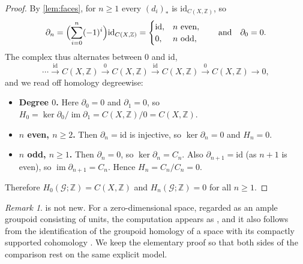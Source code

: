 \documentclass{extracta-temp-26}
\numberwithin{equation}{section}
\theoremstyle{definition}
\theoremstyle{remark}
\newtheorem{rem}[teo]{Remark}
\newcommand{\G}{\mathcal{G}}
\newcommand{\Z}{\mathbb{Z}}
\newcommand{\id}{\mathrm{id}}
\DeclareMathOperator{\im}{im}
\newcommand{\step}[1]{\textbf{#1}}
\begin{document}
\begin{proof}
By \cref{lem:faces}, for \(n\ge 1\) every \((d_i)_*\) is \(\id_{C(X,\Z)}\), so
\begin{equation}\label{eq:moore-differential}
\partial_n=\Bigl(\sum_{i=0}^n(-1)^i\Bigr)\id_{C(X,\Z)}
=
\begin{cases}
\id,& n\ \text{even},\\
0,& n\ \text{odd},
\end{cases}
\qquad\text{and}\quad\partial_0=0.
\end{equation}
The complex thus alternates between \(0\) and \(\id\),
\begin{equation}\label{eq:unit-complex}
\cdots\xrightarrow{\id}C(X,\Z)\xrightarrow{0}C(X,\Z)
\xrightarrow{\id}C(X,\Z)\xrightarrow{0}C(X,\Z)\to 0,
\end{equation}
and we read off homology degreewise:
\begin{itemize}
\item \step{Degree \(0\).} Here \(\partial_0=0\) and \(\partial_1=0\), so \(H_0=\ker\partial_0/\im\partial_1=C(X,\Z)/0=C(X,\Z)\).
\item \step{\(n\) even, \(n\ge 2\).} Then \(\partial_n=\id\) is injective, so \(\ker\partial_n=0\) and \(H_n=0\).
\item \step{\(n\) odd, \(n\ge 1\).} Then \(\partial_n=0\), so \(\ker\partial_n=C_n\).
Also \(\partial_{n+1}=\id\) (as \(n+1\) is even), so \(\im\partial_{n+1}=C_n\).
Hence \(H_n=C_n/C_n=0\).
\end{itemize}
Therefore \(H_0(\G;\Z)=C(X,\Z)\) and \(H_n(\G;\Z)=0\) for all \(n\ge 1\).
\end{proof}

\begin{rem}\label{rem:notnew}
 is not new.
For a zero-dimensional space, regarded as an ample groupoid consisting of units, the computation appears as \cite[Proposition~4.4]{farsi2019ample}, and it also follows from the identification of the groupoid homology of a space with its compactly supported cohomology \cite[3.5(3)]{crainic2000homology}.
We keep the elementary proof so that both sides of the comparison rest on the same explicit model.
\end{rem}
\end{document}

